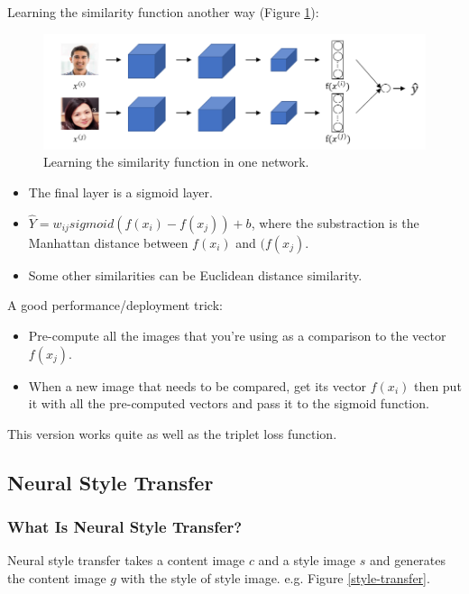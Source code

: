Learning the similarity function another way\cite{taigman2014deepface} (Figure \ref{triplet-loss}):

\begin{figure}[!htbp]
    \centering
    \includegraphics[width=1.0\textwidth]{img/c4/triplet-loss.png}
    \caption{Learning the similarity function in one network.}
    \label{triplet-loss}
\end{figure}

\begin{itemize}
    \item The final layer is a sigmoid layer.
    \item $\hat{Y} = w_{ij} sigmoid (f(x_i) - f(x_j)) + b$, where the substraction is the Manhattan distance between $f(x_i)$ and $(f(x_j)$.
    \item Some other similarities can be Euclidean distance similarity.
\end{itemize}

A good performance/deployment trick:
\begin{itemize}
    \item Pre-compute all the images that you're using as a comparison to the vector $f(x_j)$.
    \item When a new image that needs to be compared, get its vector $f(x_i)$ then put it with all the pre-computed vectors and pass it to the sigmoid function.
\end{itemize}

This version works quite as well as the triplet loss function.

\subsection{Neural Style Transfer}
\subsubsection{What Is Neural Style Transfer?}
Neural style transfer takes a content image $c$ and a style image $s$ and generates the content image $g$ with the style of style image. e.g. Figure \ref{style-transfer}.

